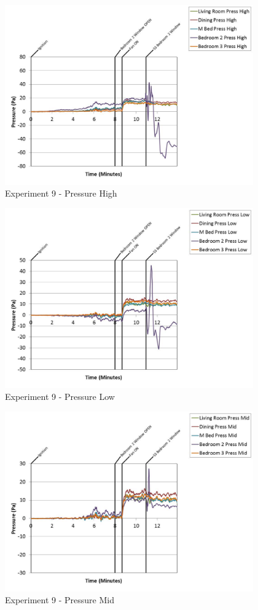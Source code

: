 \documentclass{article}
\begin{document}
\begin{appendices}
	\begin{figure}[h!]
		\centering
		\includegraphics[height=3.05in]{0_Images/Results_Charts/Exp_9_Charts/PressureHigh.pdf}
		\caption{Experiment 9 - Pressure High}
	\end{figure}
 
	\clearpage

	\begin{figure}[h!]
		\centering
		\includegraphics[height=3.05in]{0_Images/Results_Charts/Exp_9_Charts/PressureLow.pdf}
		\caption{Experiment 9 - Pressure Low}
	\end{figure}
 

	\begin{figure}[h!]
		\centering
		\includegraphics[height=3.05in]{0_Images/Results_Charts/Exp_9_Charts/PressureMid.pdf}
		\caption{Experiment 9 - Pressure Mid}
	\end{figure}
 

\end{appendices}
\end{document}

